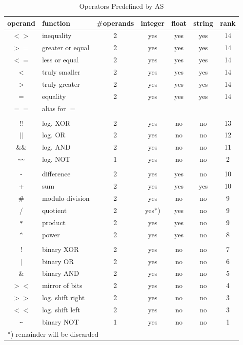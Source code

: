 \documentclass[12pt,twoside]{report}
\begin{document}
\begin{table*}[htbp]
\begin{center}\begin{tabular}{|c|l|c|c|c|c|c|}
\hline
operand & function            & \#operands & integer & float & string & rank \\
\hline
\hline
$<>$        & inequality       & 2 & yes   & yes & yes & 14 \\
$>=$        & greater or equal & 2 & yes   & yes & yes & 14 \\
$<=$        & less or equal    & 2 & yes   & yes & yes & 14 \\
$<$         & truly smaller    & 2 & yes   & yes & yes & 14 \\
$>$         & truly greater    & 2 & yes   & yes & yes & 14 \\
$=$         & equality         & 2 & yes   & yes & yes & 14 \\
$==$        & alias for $=$    &   &       &     &     &    \\
            & & & & & &  \\
$!!$        & log. XOR         & 2 & yes   & no  & no  & 13 \\
$||$        & log. OR          & 2 & yes   & no  & no  & 12 \\
\&\&        & log. AND         & 2 & yes   & no  & no  & 11 \\
\verb! ~~ ! & log. NOT         & 1 & yes   & no  & no  & 2 \\
            & & & & & &  \\
-           & difference       & 2 & yes   & yes & no  & 10 \\
+           & sum              & 2 & yes   & yes & yes & 10 \\
\#          & modulo division  & 2 & yes   & no  & no  & 9 \\
/           & quotient         & 2 & yes*) & yes & no  & 9 \\
\verb! * !  & product          & 2 & yes   & yes & no  & 9 \\
\verb! ^ !  & power            & 2 & yes   & yes & no  & 8 \\
            & & & & & &  \\
$!$         & binary XOR       & 2 & yes   & no  & no  & 7 \\
$|$         & binary OR        & 2 & yes   & no  & no  & 6 \\
\&          & binary AND       & 2 & yes   & no  & no  & 5 \\
$><$        & mirror of bits   & 2 & yes   & no  & no  & 4 \\
$>>$        & log. shift right & 2 & yes   & no  & no  & 3 \\
$<<$        & log. shift left  & 2 & yes   & no  & no  & 3 \\
\verb! ~ !  & binary NOT       & 1 & yes   & no  & no  & 1 \\
\hline
\multicolumn{7}{|l|}{*) remainder will be discarded} \\
\hline
\end{tabular}\end{center}
\caption{Operators Predefined by AS\label{TabOps}}
\end{table*}
\end{document}
